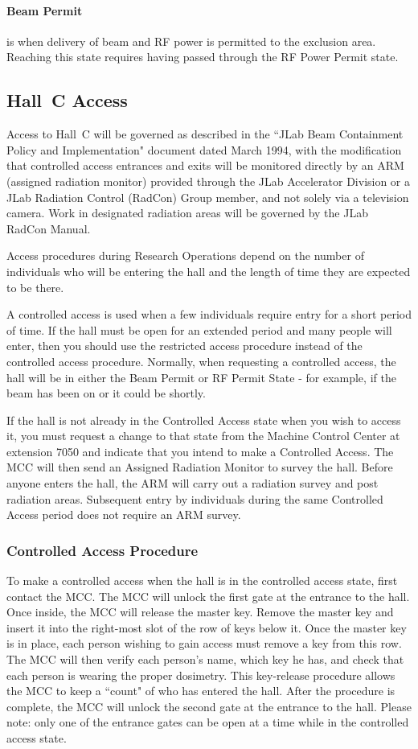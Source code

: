 \paragraph{Beam Permit} is when delivery of beam and RF power is permitted to the
exclusion area.
Reaching this state requires having passed through the RF Power Permit state.
\subsection{Hall~C Access}

Access to Hall~C will be governed as described in the ``JLab Beam 
Containment
Policy and Implementation" document dated March 1994, with the modification
that controlled
access entrances and exits will be monitored directly by an ARM (assigned
radiation monitor)
provided through the JLab Accelerator Division or a JLab Radiation
Control (RadCon)
Group member, and not solely via a television camera. Work in designated
radiation areas will
be governed by the JLab RadCon Manual.

Access procedures during Research Operations depend on the number of
individuals who
will be entering the hall and the length of time they are expected to be there.

A controlled access is used when a few individuals require entry for a
short period of
time. If the hall must be open for an extended period and many people will
enter, then you
should use the restricted access procedure instead of the controlled access
procedure.  Normally,
when requesting a controlled access, the hall will be in either the Beam
Permit or RF Permit
State - for example, if the beam has been on or it could be shortly.

If the hall is not already in the Controlled Access state when you 
wish to access it, you
must request a change to that state from the Machine Control Center at
extension 7050 and
indicate that you intend to make a Controlled Access. The MCC will then
send an Assigned
Radiation Monitor to survey the hall. Before anyone enters the hall, the
ARM will carry out a
radiation survey and post radiation areas. Subsequent entry by individuals
during the same
Controlled Access period does not require an ARM survey.

\subsubsection{Controlled Access Procedure}
To make a controlled access when the hall is in the controlled access
state, first contact the MCC. The MCC will unlock the first gate at
the entrance to the hall. Once inside, the MCC will release the master
key. Remove the master key and insert it into the right-most slot of
the row of keys below it. Once the master key is in place, each person
wishing to gain access must remove a key from this row. The MCC will
then verify each person's name, which key he has, and check that each
person is wearing the proper dosimetry. This key-release procedure
allows the MCC to keep a ``count" of who has entered the hall. After
the  procedure is complete, the MCC will unlock the second gate at the
entrance to the hall. Please note: only one of the entrance gates can
be open at a time while in the controlled access state.

